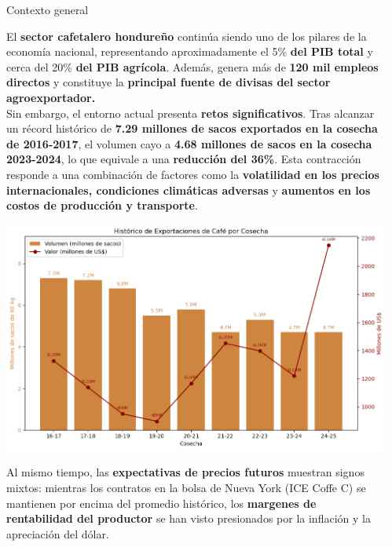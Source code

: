 \documentclass[final]{beamer}
\newlength{\sepwidth}
\newlength{\colwidth}
\newcommand{\separatorcolumn}{\begin{column}{\sepwidth}\end{column}}
\begin{document}
\begin{frame}[t]
\begin{columns}[t]
\separatorcolumn

\begin{column}{\colwidth}

  \begin{block}{Contexto general}

    El \textbf{sector cafetalero hondureño} continúa siendo uno de los pilares de la economía nacional, representando aproximadamente el 5\% \textbf{del PIB total} y cerca del 20\% \textbf{del PIB agrícola}. Además, genera más de \textbf{120 mil empleos directos} y constituye la \textbf{principal fuente de divisas del sector agroexportador.}\\[0.4cm]

   Sin embargo, el entorno actual presenta \textbf{retos significativos}. Tras alcanzar un récord histórico de \textbf{7.29 millones de sacos exportados en la cosecha de 2016-2017}, el volumen cayo a \textbf{4.68 millones de sacos en la cosecha 2023-2024}, lo que equivale a una \textbf{reducción del 36\%}. Esta contracción responde a una combinación de factores como la \textbf{volatilidad en los precios internacionales, condiciones climáticas adversas} y \textbf{aumentos en los costos de producción y transporte}.  
   
   \begin{center}
    \includegraphics[scale=0.55]{fig1.jpg}
   \end{center}

Al mismo tiempo, las \textbf{expectativas de precios futuros} muestran signos mixtos: mientras los contratos en la bolsa de Nueva York (ICE Coffe C) se mantienen por encima del promedio histórico, los \textbf{margenes de rentabilidad del productor} se han visto presionados por la inflación y la apreciación del dólar.\\[0.4cm]


\end{block}
\end{column}
\end{columns}
\end{frame}
\end{document}
